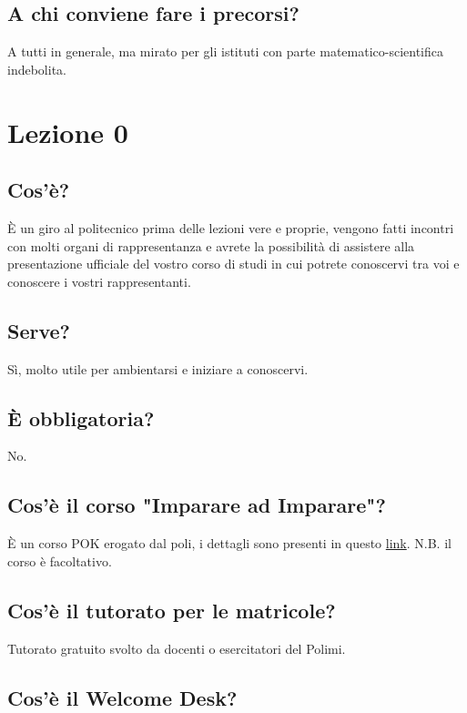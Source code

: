 \documentclass[legal]{polinetwork}
\begin{document}
\subsection{A chi conviene fare i precorsi?}


A tutti in generale, ma mirato per gli istituti con parte matematico-scientifica indebolita.

\section{Lezione 0}


\subsection{Cos'è?}


È un giro al politecnico prima delle lezioni vere e proprie, vengono fatti incontri con molti organi di rappresentanza e avrete la possibilità di assistere alla presentazione ufficiale del vostro corso di studi in cui potrete conoscervi tra voi e conoscere i vostri rappresentanti.

\subsection{Serve?}


Sì, molto utile per ambientarsi e iniziare a conoscervi.

\subsection{È obbligatoria?}


No.

\subsection{Cos'è il corso "Imparare ad Imparare"?}


È un corso POK erogato dal poli, i dettagli sono presenti in questo \href{https://www.pok.polimi.it/course/view.php?id=270}{link}. N.B. il corso è facoltativo.

\subsection{Cos'è il tutorato per le matricole?}


Tutorato gratuito svolto da docenti o esercitatori del Polimi.

\subsection{Cos'è il Welcome Desk?}
\end{document}
